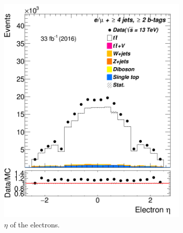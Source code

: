\begin{figure} [b]
 \begin{subfigure}{0.25\textwidth}
 	\includegraphics[width=\linewidth]{ControlPlots_emujets_2016_4incl_2incl/el_eta_emujets_2016.png}
 	\caption{$\eta$ of the electrons.} \label{fig:Sec9}
 \end{subfigure}\hspace*{0.5cm}
 \begin{subfigure}{0.25\textwidth}

\end{subfigure}
\end{figure}
